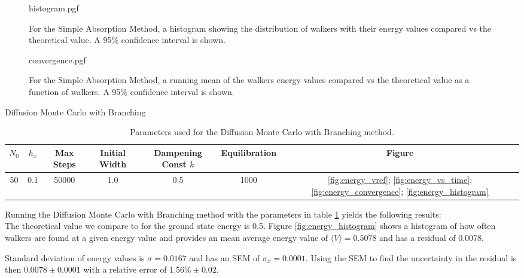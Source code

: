 \documentclass[reqno]{amsart}
\makeatletter
\renewcommand\subsection{\@startsection{subsection}{2}%
  \z@{.5\linespacing\@plus.7\linespacing}{-.5em}%
  {\normalfont\scshape\justify}}
\numberwithin{equation}{section}
\numberwithin{figure}{section}
\makeatother
\begin{document}
\begin{figure}[h]
    \centering
    {histogram.pgf}
    \caption{For the Simple Absorption Method, a histogram showing the distribution of walkers with their energy values compared vs the theoretical value. A 95\% confidence interval is shown.}
    \label{fig:SA_histogram}
\end{figure}

\begin{figure}[h]
    \centering
    {convergence.pgf}
    \caption{For the Simple Absorption Method, a running mean of the walkers energy values compared vs the theoretical value as a function of walkers. A 95\% confidence interval is shown.}
    \label{fig:SA_convergence}
\end{figure}

\subsection{Diffusion Monte Carlo with Branching}

\begin{table}[h]
    \centering
    \begin{tabular}{ccccccc}
        \hline
        $N_0$ & $h_x$ & Max Steps & Initial Width & Dampening Const $k$ & Equilibration & Figure \\
        \hline
        50 & 0.1 & 50000 & 1.0 & 0.5 & 1000 & \ref{fig:energy_vref}; \ref{fig:energy_vs_time}; \ref{fig:energy_convergence}; \ref{fig:energy_histogram} \\
        \hline
    \end{tabular}
    \caption{Parameters used for the Diffusion Monte Carlo with Branching method.}
    \label{tab:SA_params}
\end{table}

Running the Diffusion Monte Carlo with Branching method with the parameters in table \ref{tab:SA_params} yields the following results: \\

The theoretical value we compare to for the ground state energy is 0.5. Figure \ref{fig:energy_histogram} shows a histogram of how often walkers are found at a given energy value and provides an mean average energy value of $\langle V \rangle = 0.5078$ and has a residual of 0.0078.

Standard deviation of energy values is $\sigma = 0.0167$ and has an SEM of $\sigma_{\bar{x}} = 0.0001$. Using the SEM to find the uncertainty in the residual is then $0.0078 \pm 0.0001$ with a relative error of $1.56\% \pm 0.02$. \\
\end{document}
